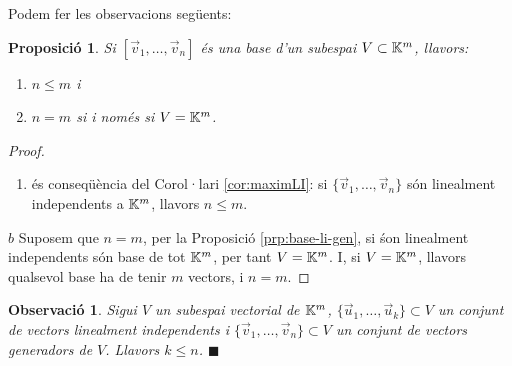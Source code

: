 \documentclass[
  11pt,
]{book}
\providecommand{\tightlist}{%
  \setlength{\itemsep}{0pt}\setlength{\parskip}{0pt}}
\numberwithin{dummy}{section}
\theoremstyle{maincolornumbox}
\newtheorem{remarkT}{Observació}[chapter]
\theoremstyle{blacknumex}
\theoremstyle{blacknumbox}
\theoremstyle{maincolornum}
\newtheorem{propositionT}{Proposició}[chapter]
\newenvironment{proposition}{\begin{pBox}\begin{propositionT}}{\end{propositionT}\end{pBox}}
\newenvironment{remark}{\begin{remarkT}}{\hfill{\tiny\ensuremath{\blacksquare}}\end{remarkT}}
\newlength\esp
\begin{document}
Podem fer les observacions següents:

\begin{proposition}

Si \([\vec v_1, \dots, \vec v_n]\) és una base d'un subespai
\(V\subset \mathbb{K}^m\), llavors:

\begin{enumerate}
\def\labelenumi{\arabic{enumi}.}
\item
  \(n\leq m\) i
\item
  \(n=m\) si i només si \(V=\mathbb{K}^m\).
\end{enumerate}

\end{proposition}

\begin{proof}
\leavevmode

\begin{enumerate}
\def\labelenumi{(\alph{enumi})}
\tightlist
\item
  és conseqüència del Corol·lari
  \ref{cor:maximLI}: si \(\{ \vec v_1, \dots, \vec v_n \}\) són
  linealment independents a \(\mathbb{K}^m\), llavors \(n\leq m\).
\end{enumerate}

\(b\) Suposem que \(n=m\), per la Proposició
\ref{prp:base-li-gen}, si śon linealment independents són base
de tot \(\mathbb{K}^m\), per tant \(V=\mathbb{K}^m\). I, si \(V=\mathbb{K}^m\), llavors qualsevol base
ha de tenir \(m\) vectors, i \(n=m\).

\end{proof}

\begin{remark}
Sigui \(V\) un subespai vectorial de \(\mathbb{K}^m\),
\(\{\vec u_1,\dots,\vec u_k\}\subset V\) un conjunt de vectors linealment
independents i \(\{\vec v_1,\dots,\vec v_n\}\subset V\) un conjunt de
vectors generadors de \(V\). Llavors \(k\leq n\).
\end{remark}
\end{document}
